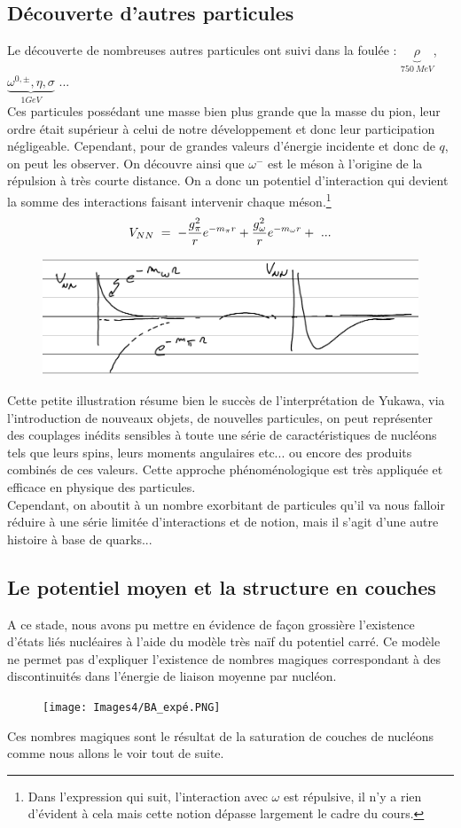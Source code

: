 \subsection{Découverte d'autres particules}


Le découverte de nombreuses autres particules ont suivi dans la foulée : $\underbrace{\rho}_{\SI{750}{MeV}}$, $\underbrace{\omega^{0,\pm},\eta, \sigma}_{1GeV}$ ...\\
Ces particules possédant une masse bien plus grande que la masse du pion, leur ordre était supérieur à celui de notre développement et donc leur participation négligeable. Cependant, pour de grandes valeurs d'énergie incidente et donc de $q$, on peut les observer. On découvre ainsi que $\omega^-$ est le méson à l'origine de la répulsion à très courte distance. On a donc un potentiel d'interaction qui devient la somme des interactions faisant intervenir chaque méson.\footnote{Dans l'expression qui suit, l'interaction avec $\omega$ est répulsive, il n'y a rien d'évident à cela mais cette notion dépasse largement le cadre du cours.}
\[
    V_{NN}\; = \; - \dfrac{g^2_\pi}{r}e^{-m_\pi r} +  \dfrac{g^2_\omega}{r}e^{-m_\omega r} +\ ...
\]
\begin{figure}[H]
    \centering
    \includegraphics[scale = 0.8]{Images4/Potentiel NN.PNG}
\end{figure}
Cette petite illustration résume bien le succès de l'interprétation de Yukawa, via l'introduction de nouveaux objets, de nouvelles particules, on peut représenter des couplages inédits sensibles à toute une série de caractéristiques de nucléons tels que leurs spins, leurs moments angulaires etc... ou encore des produits combinés de ces valeurs. Cette approche phénoménologique est très appliquée et efficace en physique des particules.\\
Cependant, on aboutit à un nombre exorbitant de particules qu'il va nous falloir réduire à une série limitée d'interactions et de notion, mais il s'agit d'une autre histoire à base de quarks...
\subsection{Le potentiel moyen et la structure en couches}
A ce stade, nous avons pu mettre en évidence de façon grossière l'existence d'états liés nucléaires à l'aide du modèle très naïf du potentiel carré. Ce modèle ne permet pas d'expliquer l'existence de nombres magiques correspondant à des discontinuités dans l'énergie de liaison moyenne par nucléon.
\begin{figure}[H]
    \centering
    \texttt{[image: Images4/BA\_expé.PNG]}
    \caption{}
\end{figure}
Ces nombres magiques sont le résultat de la saturation de couches de nucléons comme nous allons le voir tout de suite.
